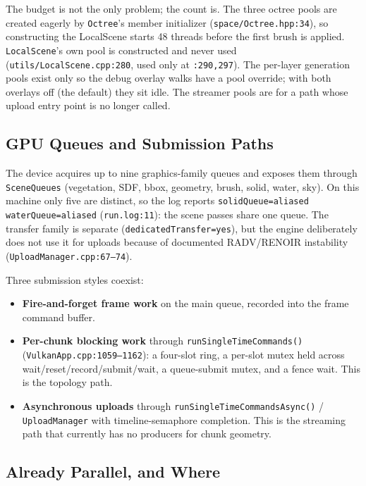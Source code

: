 \documentclass[11pt,a4paper]{article}
\begin{document}
The budget is not the only problem; the count is. The three octree pools are
created eagerly by \texttt{Octree}'s member initializer
(\texttt{space/Octree.hpp:34}), so constructing the LocalScene starts 48
threads before the first brush is applied. \texttt{LocalScene}'s own pool is
constructed and never used (\texttt{utils/LocalScene.cpp:280}, used only at
\texttt{:290,297}). The per-layer generation pools exist only so the debug
overlay walks have a pool override; with both overlays off (the default) they
sit idle. The streamer pools are for a path whose upload entry point is no
longer called.

\subsection{GPU Queues and Submission Paths}

The device acquires up to nine graphics-family queues and exposes them
through \texttt{SceneQueues} (vegetation, SDF, bbox, geometry, brush, solid,
water, sky). On this machine only five are distinct, so the log reports
\texttt{solidQueue=aliased waterQueue=aliased} (\texttt{run.log:11}): the
scene passes share one queue. The transfer family is separate
(\texttt{dedicatedTransfer=yes}), but the engine deliberately does not use it
for uploads because of documented RADV/RENOIR instability
(\texttt{UploadManager.cpp:67--74}).

Three submission styles coexist:

\begin{itemize}[leftmargin=1.4em,itemsep=2pt]
\item \textbf{Fire-and-forget frame work} on the main queue, recorded into
the frame command buffer.
\item \textbf{Per-chunk blocking work} through
\texttt{runSingleTimeCommands()} (\texttt{VulkanApp.cpp:1059--1162}): a
four-slot ring, a per-slot mutex held across wait/reset/record/submit/wait, a
queue-submit mutex, and a fence wait. This is the topology path.
\item \textbf{Asynchronous uploads} through
\texttt{runSingleTimeCommandsAsync()} /
\texttt{UploadManager} with timeline-semaphore completion. This is the
streaming path that currently has no producers for chunk geometry.
\end{itemize}

\subsection{Already Parallel, and Where}
\end{document}
